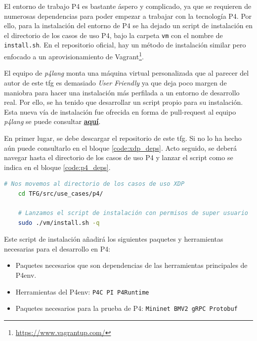 El entorno de trabajo P4 es bastante áspero y complicado, ya que se requieren de numerosas dependencias para poder empezar a trabajar con la tecnología P4. Por ello, para la instalación del entorno de P4 se ha dejado un script de instalación en el directorio de los casos de uso P4, bajo la carpeta \texttt{vm} con el nombre de \texttt{install.sh}. En el repositorio oficial, hay un método de instalación similar pero enfocado a un aprovisionamiento de Vagrant\footnote{\url{https://www.vagrantup.com/}}. \\
\par
El equipo de \textit{p4lang} monta una máquina virtual personalizada que al parecer del autor de este \gls{tfg} es demasiado \textit{User Friendly} ya que deja poco margen de maniobra para hacer una instalación más perfilada a un entorno de desarrollo real. Por ello, se ha tenido que desarrollar un script propio para su instalación. Esta nueva vía de instalación fue ofrecida en forma de pull-request al equipo \textit{p4lang} se puede consultar \href{https://github.com/p4lang/tutorials/pull/261}{\textbf{aquí}}.\\
\par

En primer lugar, se debe descargar el repositorio de este \gls{tfg}. Si no lo ha hecho aún puede consultarlo en el bloque \ref{code:xdp_deps}. Acto seguido, se deberá navegar hasta el directorio de los casos de uso P4 y lanzar el script como se indica en el bloque \ref{code:p4_deps}.

\begin{lstlisting}[language= bash, style=Consola, caption={Instalación de dependencias P4},label=code:p4_deps]
    # Nos movemos al directorio de los casos de uso XDP
    cd TFG/src/use_cases/p4/
    
    # Lanzamos el script de instalación con permisos de super usuario
    sudo ./vm/install.sh -q
\end{lstlisting}

Este script de instalación añadirá los siguientes paquetes y herramientas necesarias para el desarrollo en P4:

\begin{itemize}
    \item Paquetes necesarios que son dependencias de las herramientas principales de P4env.
    \item Herramientas del P4env: \texttt{P4C PI P4Runtime}
    \item Paquetes necesarios para la prueba de P4: \texttt{Mininet BMV2 gRPC Protobuf}
\end{itemize}


